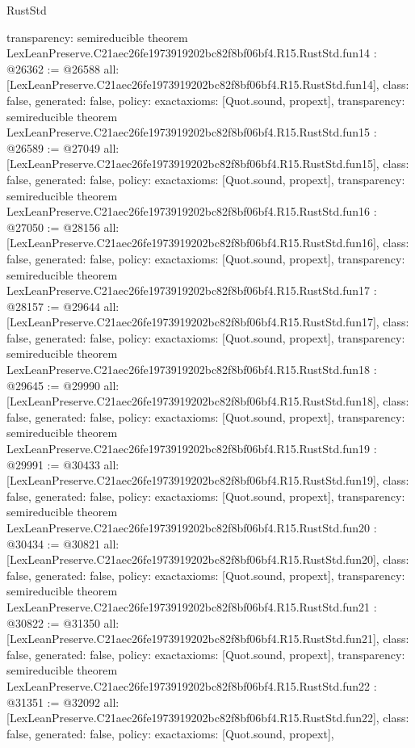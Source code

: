 \begin{lexlean}{RustStd}
\begin{coremodule}
{  transparency: semireducible
}
theorem LexLeanPreserve.C21aec26fe1973919202bc82f8bf06bf4.R15.RustStd.fun14 : @26362 := @26588 {
  all: [LexLeanPreserve.C21aec26fe1973919202bc82f8bf06bf4.R15.RustStd.fun14],
  class: false,
  generated: false,
  policy: exact{axioms: [Quot.sound, propext]},
  transparency: semireducible
}
theorem LexLeanPreserve.C21aec26fe1973919202bc82f8bf06bf4.R15.RustStd.fun15 : @26589 := @27049 {
  all: [LexLeanPreserve.C21aec26fe1973919202bc82f8bf06bf4.R15.RustStd.fun15],
  class: false,
  generated: false,
  policy: exact{axioms: [Quot.sound, propext]},
  transparency: semireducible
}
theorem LexLeanPreserve.C21aec26fe1973919202bc82f8bf06bf4.R15.RustStd.fun16 : @27050 := @28156 {
  all: [LexLeanPreserve.C21aec26fe1973919202bc82f8bf06bf4.R15.RustStd.fun16],
  class: false,
  generated: false,
  policy: exact{axioms: [Quot.sound, propext]},
  transparency: semireducible
}
theorem LexLeanPreserve.C21aec26fe1973919202bc82f8bf06bf4.R15.RustStd.fun17 : @28157 := @29644 {
  all: [LexLeanPreserve.C21aec26fe1973919202bc82f8bf06bf4.R15.RustStd.fun17],
  class: false,
  generated: false,
  policy: exact{axioms: [Quot.sound, propext]},
  transparency: semireducible
}
theorem LexLeanPreserve.C21aec26fe1973919202bc82f8bf06bf4.R15.RustStd.fun18 : @29645 := @29990 {
  all: [LexLeanPreserve.C21aec26fe1973919202bc82f8bf06bf4.R15.RustStd.fun18],
  class: false,
  generated: false,
  policy: exact{axioms: [Quot.sound, propext]},
  transparency: semireducible
}
theorem LexLeanPreserve.C21aec26fe1973919202bc82f8bf06bf4.R15.RustStd.fun19 : @29991 := @30433 {
  all: [LexLeanPreserve.C21aec26fe1973919202bc82f8bf06bf4.R15.RustStd.fun19],
  class: false,
  generated: false,
  policy: exact{axioms: [Quot.sound, propext]},
  transparency: semireducible
}
theorem LexLeanPreserve.C21aec26fe1973919202bc82f8bf06bf4.R15.RustStd.fun20 : @30434 := @30821 {
  all: [LexLeanPreserve.C21aec26fe1973919202bc82f8bf06bf4.R15.RustStd.fun20],
  class: false,
  generated: false,
  policy: exact{axioms: [Quot.sound, propext]},
  transparency: semireducible
}
theorem LexLeanPreserve.C21aec26fe1973919202bc82f8bf06bf4.R15.RustStd.fun21 : @30822 := @31350 {
  all: [LexLeanPreserve.C21aec26fe1973919202bc82f8bf06bf4.R15.RustStd.fun21],
  class: false,
  generated: false,
  policy: exact{axioms: [Quot.sound, propext]},
  transparency: semireducible
}
theorem LexLeanPreserve.C21aec26fe1973919202bc82f8bf06bf4.R15.RustStd.fun22 : @31351 := @32092 {
  all: [LexLeanPreserve.C21aec26fe1973919202bc82f8bf06bf4.R15.RustStd.fun22],
  class: false,
  generated: false,
  policy: exact{axioms: [Quot.sound, propext]},
}
\end{coremodule}
\end{lexlean}
